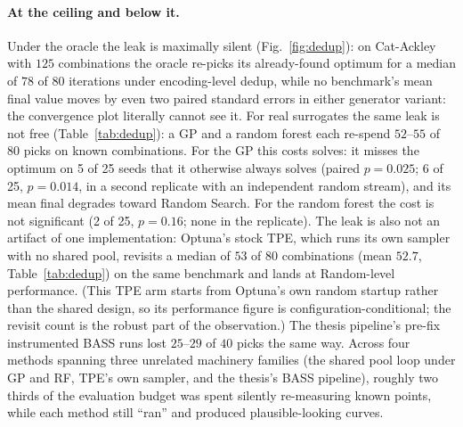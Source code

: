\documentclass[%
 aip,
 amsmath,amssymb,
 floatfix,
 reprint,%
]{revtex4-1}
\begin{document}
\paragraph{At the ceiling and below it.}
Under the oracle the leak is maximally silent
(Fig.~\ref{fig:dedup}): on Cat-Ackley with $125$
combinations the oracle re-picks its already-found optimum for a median
of $78$ of $80$ iterations under encoding-level dedup, while no
benchmark's mean final value moves by even two paired standard errors in
either generator variant: the convergence plot literally cannot see
it. For real surrogates the same leak is not free
(Table~\ref{tab:dedup}): a GP and a random forest each re-spend $52$--$55$
of $80$ picks on known combinations. For the GP this costs solves: it
misses the optimum on 5 of 25 seeds that it otherwise always solves
(paired $p = 0.025$; 6 of 25, $p = 0.014$, in a second replicate with an
independent random stream), and its mean final degrades toward Random
Search. For the random forest the cost is not significant (2 of 25,
$p = 0.16$; none in the replicate). The leak is also not an artifact of one
implementation: Optuna's stock TPE, which runs its own sampler with no
shared pool, revisits a median of $53$ of $80$ combinations (mean $52.7$,
Table~\ref{tab:dedup}) on the same benchmark and lands at Random-level
performance. (This TPE arm starts from Optuna's own random startup
rather than the shared design, so its performance figure is
configuration-conditional; the revisit count is the robust part of the
observation.) The thesis
pipeline's pre-fix instrumented BASS runs lost $25$--$29$ of $40$ picks
the same way. Across four methods spanning three unrelated machinery
families (the shared pool loop under GP and RF, TPE's own sampler, and
the thesis's BASS pipeline), roughly two thirds of the evaluation budget
was spent silently re-measuring known points, while each method still
``ran'' and produced plausible-looking curves.
\end{document}
